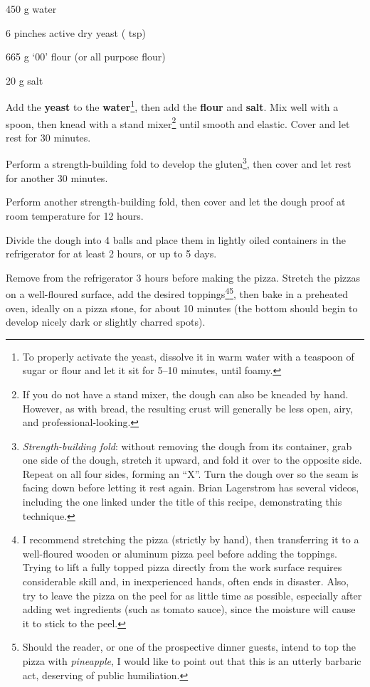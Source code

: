 \newpage
{}

\begin{ingredients}
	\item 450 g water
	\item 6 pinches active dry yeast ( tsp)
	\item 665 g `00' flour (or all purpose flour)
	\item 20 g salt
\end{ingredients}

\medskip

Add the \textbf{yeast} to the \textbf{water}\footnote{To properly activate the yeast, dissolve it in warm water with a teaspoon of sugar or flour and let it sit for 5--10 minutes, until foamy.}, then add the \textbf{flour} and \textbf{salt}.
Mix well with a spoon, then knead with a stand mixer\footnote{If you do not have a stand mixer, the dough can also be kneaded by hand. However, as with bread, the resulting crust will generally be less open, airy, and professional-looking.} until smooth and elastic.
Cover and let rest for 30 minutes.

Perform a strength-building fold to develop the gluten\footnote{\textit{Strength-building fold}: without removing the dough from its container, grab one side of the dough, stretch it upward, and fold it over to the opposite side. Repeat on all four sides, forming an ``X''. Turn the dough over so the seam is facing down before letting it rest again. Brian Lagerstrom has several videos, including the one linked under the title of this recipe, demonstrating this technique.}, then cover and let rest for another 30 minutes.

Perform another strength-building fold, then cover and let the dough proof at room temperature for 12 hours. 

Divide the dough into 4 balls and place them in lightly oiled containers in the refrigerator for at least 2 hours, or up to 5 days. 

Remove from the refrigerator 3 hours before making the pizza.
Stretch the pizzas on a well-floured surface, add the desired toppings\footnote{I recommend stretching the pizza (strictly by hand), then transferring it to a well-floured wooden or aluminum pizza peel before adding the toppings. Trying to lift a fully topped pizza directly from the work surface requires considerable skill and, in inexperienced hands, often ends in disaster. Also, try to leave the pizza on the peel for as little time as possible, especially after adding wet ingredients (such as tomato sauce), since the moisture will cause it to stick to the peel.}\footnote{Should the reader, or one of the prospective dinner guests, intend to top the pizza with \textit{pineapple}, I would like to point out that this is an utterly barbaric act, deserving of public humiliation.}, then bake in a preheated oven, ideally on a pizza stone, for about 10 minutes (the bottom should begin to develop nicely dark or slightly charred spots).

